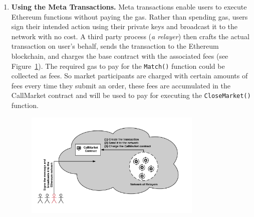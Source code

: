 \begin{enumerate}

\item \textbf {Using the Meta Transactions.} Meta transactions enable users to execute Ethereum functions without paying the gas. Rather than spending gas, users sign their intended action using their private keys and broadcast it to the network with no cost. A third party process (\textit{a relayer}) then crafts the actual transaction on user's behalf, sends the transaction to the Ethereum blockchain, and charges the base contract with the associated fees (see Figure~\ref{fig:meta_tx}). The required gas to pay for the \texttt{Match()} function could be collected as fees. So market participants are charged with certain amounts of fees every time they submit an order, these fees are accumulated in the CallMarket contract and will be used to pay for executing the \texttt{CloseMarket()} function.


\begin{figure}[htb!p]
\centering
\includegraphics[width=0.8\textwidth]{fig/meta_tx.png}
\caption{\footnotesize{}  \label{fig:meta_tx}}
\end{figure}



\end{enumerate}
